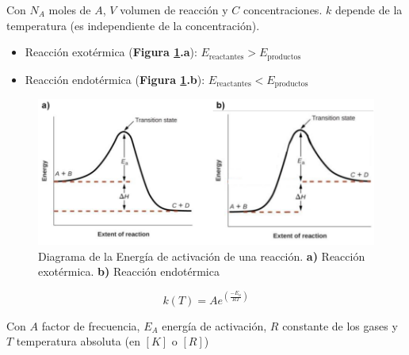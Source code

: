         Con \(N_{A}\) moles de \(A\), \(V\) volumen de reacción y \(C\) concentraciones. \(k\) depende de la temperatura (es independiente de la concentración).
            
            \begin{itemize}
                \item Reacción exotérmica (\textbf{Figura \ref{fig:energia_activacion}.a}): \(E_{\text{reactantes}} > E_{\text{productos}}\)
                \item Reacción endotérmica (\textbf{Figura \ref{fig:energia_activacion}.b}): \(E_{\text{reactantes}} < E_{\text{productos}}\)
            \end{itemize}
            
            \begin{figure}
                \centering
                \includegraphics[width=\textwidth]{img/graficos/energia_activacion.png}
                \caption[Diagrama de la Energía de activación de una reacción]{Diagrama de la Energía de activación de una reacción. \textbf{a)} Reacción exotérmica. \textbf{b)} Reacción endotérmica}
                \label{fig:energia_activacion}
            \end{figure}
            
            
            \begin{equation}
            \label{eq:arrhenius}
                k\left ( T \right ) = A e^{\left ( \frac{-E_{a}}{RT} \right )}
            \end{equation}
            
            Con \(A\) factor de frecuencia, \(E_{A}\) energía de activación, \(R\) constante de los gases y \(T\) temperatura absoluta (en \([K]\) o \([R]\))
            
